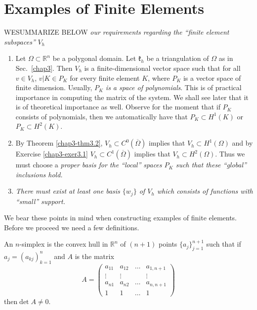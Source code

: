 
\chapter{Examples of Finite Elements}\label{chap4}

WE\pageoriginale SUMMARIZE BELOW {\em our requirements regarding the
  ``finite element subspaces''} $V_{h}$
\begin{enumerate}
\renewcommand{\theenumi}{\roman{enumi}}
\renewcommand{\labelenumi}{(\theenumi)}
\item Let $\Omega\subset \mathbb{R}^{n}$ be a polygonal domain. Let
  $\mathfrak{k}_{h}$ be a triangulation of $\Omega$ as in
  Sec.~\ref{chap3}. Then $V_{h}$ is a finite-dimensional vector space
  such that for all $v\in V_{h}$, $v|K\in P_{K}$ for every finite
  element $K$, where $P_{K}$ is a vector space of finite
  dimension. Usually, $P_{K}$ {\em is a space of polynomials}. This is
  of practical importance in computing the matrix of the system. We
  shall see later that it is of theoretical importance as
  well. Observe for the moment that if $P_{K}$ consists of
  polynomials, then we automatically have that $P_{K}\subset H^{1}(K)$
  or $P_{K}\subset H^{2}(K)$. 

\item By Theorem \ref{chap3-thm3.2}, $V_{h}\subset
  C^{0}(\overline{\Omega})$ implies that $V_{h}\subset H^{1}(\Omega)$
  and by Exercise \ref{chap3-exer3.1} $V_{h}\subset
  C^{1}(\overline{\Omega})$ implies that $V_{h}\subset
  H^{2}(\Omega)$. Thus we must choose a {\em proper basis for the
    ``local'' spaces $P_{K}$ such that these ``global'' inclusions
    hold.}

\item {\em There must exist at least one basis $\{w_{j}\}$ of $V_{h}$
  which consists of functions with ``small'' support.}
\end{enumerate}

We bear these points in mind when constructing examples of finite
elements. Before we proceed we need a few definitions.

\begin{definition}\label{chap4-defi4.1}
An $n$-simplex is the convex hull in $\mathbb{R}^{n}$ of $(n+1)$
points $\{a_{j}\}^{n+1}_{j=1}$ such that if $a_{j}=(a_{kj})^{n}_{k=1}$
and $A$ is the matrix
\begin{equation*}
A=
\begin{pmatrix}
a_{11} & a_{12} & \ldots & a_{1,n+1}\\
\vdots & \vdots & & \vdots\\
a_{n1} & a_{n2} & \ldots & a_{n,n+1}\\
1 & 1 & \ldots & 1
\end{pmatrix}\tag{4.1}\label{chap4-eq4.1}
\end{equation*}
then\pageoriginale $\det A\neq 0$.
\end{definition}

